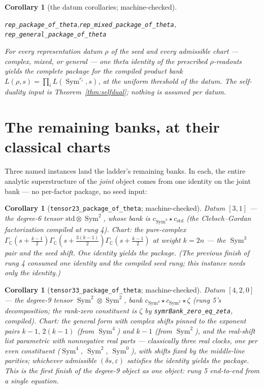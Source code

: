 \documentclass[11pt]{article}
\newtheorem{corollary}[theorem]{Corollary}
\newcommand{\Sym}{\operatorname{Sym}}
\newcommand{\Gm}{\Gamma_{\mathbb C}}
\begin{document}
\begin{corollary}[the datum corollaries; machine-checked]\label{cor:rep}
\begin{center}
\texttt{rep\_package\_of\_theta},\quad \texttt{rep\_mixed\_package\_of\_theta},\\
\texttt{rep\_general\_package\_of\_theta}
\end{center}
For every representation datum $\rho$ of the seed and every admissible chart ---
complex, mixed, or general --- one theta identity of the prescribed $\rho$-readouts
yields the complete package for the compiled product bank
$L(\rho,s)=\prod_iL(\Sym^{r_i},s)$, at the uniform threshold of the datum.  The
self-duality input is Theorem~\ref{thm:selfdual}; nothing is assumed per datum.
\end{corollary}

\section{The remaining banks, at their classical charts}

Three named instances land the ladder's remaining banks.  In each, the entire
analytic superstructure of the \emph{joint} object comes from one identity on the
joint bank --- no per-factor package, no seed input:

\begin{corollary}[\texttt{tensor23\_package\_of\_theta}; machine-checked]
Datum $[3,1]$ --- the degree-6 tensor $\mathrm{std}\otimes\Sym^2$, whose bank is
$c_{\Sym^3}\!\star c_{\mathrm{std}}$ (the Clebsch--Gordan factorization compiled at
rung 4).  Chart: the pure-complex
$\Gm(s+\tfrac{k-1}2)\Gm(s+\tfrac{3(k-1)}2)\Gm(s+\tfrac{k-1}2)$ at weight $k=2n$ ---
the $\Sym^3$ pair and the seed shift.  One identity yields the package.  (The previous
finish of rung 4 consumed one identity \emph{and} the compiled seed rung; this
instance needs only the identity.)
\end{corollary}

\begin{corollary}[\texttt{tensor33\_package\_of\_theta}; machine-checked]
Datum $[4,2,0]$ --- the degree-9 tensor $\Sym^2\otimes\Sym^2$, bank
$c_{\Sym^4}\star c_{\Sym^2}\star\zeta$ (rung 5's decomposition; the rank-zero
constituent is $\zeta$ by \texttt{symrBank\_zero\_eq\_zeta}, compiled).  Chart: the general
form with complex shifts pinned to the exponent pairs $k{-}1,\,2(k{-}1)$ (from
$\Sym^4$) and $k{-}1$ (from $\Sym^2$), and the real-shift list parametric with
nonnegative real parts --- classically three real clocks, one per even constituent
($\Sym^4$, $\Sym^2$, $\Sym^0$), with shifts fixed by the middle-line parities;
whichever admissible $(\delta s,\varepsilon)$ satisfies the identity yields the
package.  This is the first finish of the degree-9 object as one object: rung 5
end-to-end from a single equation.
\end{corollary}
\end{document}
